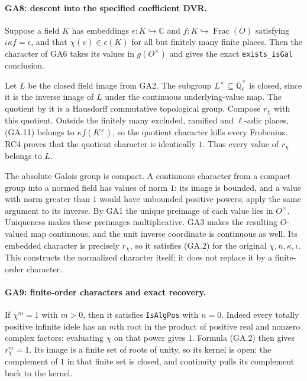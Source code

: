\paragraph{GA8: descent into the specified coefficient DVR.}
Suppose a field $K$ has embeddings
$\epsilon:K\hookrightarrow\mathbb C$ and
$f:K\hookrightarrow\operatorname{Frac}(O)$ satisfying
$\iota\kappa f=\epsilon$, and that $\chi(v)\in\epsilon(K)$
for all but finitely many finite places. Then the character
of GA6 takes its values in $g(O^\times)$ and gives the exact
\texttt{exists\_isGal} conclusion.

Let $L$ be the closed field image from GA2. The subgroup
$L^\times\subseteq\overline{\mathbb Q}_\ell^\times$ is
closed, since it is the inverse image of $L$ under the
continuous underlying-value map. The quotient by it is a
Hausdorff commutative topological group. Compose $r_\chi$
with this quotient. Outside the finitely many excluded,
ramified and $\ell$-adic places, (GA.11) belongs to
$\kappa f(K^\times)$, so the quotient character kills every
Frobenius. RC4 proves that the quotient character is
identically $1$. Thus every value of $r_\chi$ belongs to $L$.

The absolute Galois group is compact. A continuous character
from a compact group into a normed field has values of norm
$1$: its image is bounded, and a value with norm greater
than $1$ would have unbounded positive powers; apply the
same argument to its inverse. By GA1 the unique preimage
of each value lies in $O^\times$. Uniqueness makes these
preimages multiplicative. GA3 makes the resulting $O$-valued
map continuous, and the unit inverse coordinate is continuous
as well. Its embedded character is precisely $r_\chi$, so it
satisfies (GA.2) for the original $\chi,n,\kappa,\iota$.
This constructs the normalized character itself; it does not
replace it by a finite-order character.

\paragraph{GA9: finite-order characters and exact recovery.}
If $\chi^m=1$ with $m>0$, then it satisfies
\texttt{IsAlgPos} with $n=0$. Indeed every totally positive
infinite idele has an $m$th root in the product of positive
real and nonzero complex factors; evaluating $\chi$ on
that power gives $1$. Formula (GA.2) then gives
$r_\chi^m=1$. Its image is a finite set of roots of unity,
so its kernel is open: the complement of $1$ in that
finite set is closed, and continuity pulls its complement
back to the kernel.

